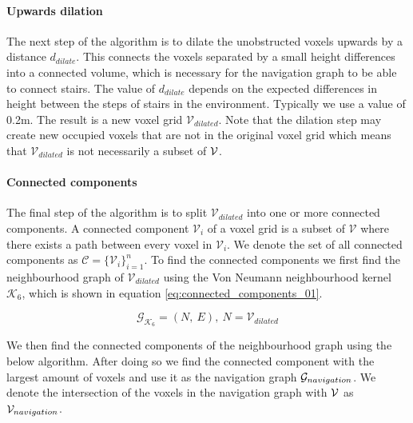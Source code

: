 \paragraph{Upwards dilation}
The next step of the algorithm is to dilate the unobstructed voxels upwards by a distance \(d_{dilate}\). This connects the voxels separated by a small height differences into a connected volume, which is necessary for the navigation graph to be able to connect stairs. The value of \(d_{dilate}\) depends on the expected differences in height between the steps of stairs in the environment. Typically we use a value of 0.2m. The result is a new voxel grid \(\mathcal{V}_{dilated}\). Note that the dilation step may create new occupied voxels that are not in the original voxel grid which means that \(\mathcal{V}_{dilated}\) is not necessarily a subset of \(\mathcal{V}\).

\paragraph{Connected components}
The final step of the algorithm is to split \(\mathcal{V}_{dilated}\) into one or more connected components. A connected component \(\mathcal{V}_i\) of a voxel grid is a subset of \(\mathcal{V}\) where there exists a path between every voxel in \(\mathcal{V}_i\). We denote the set of all connected components as \(\mathcal{C}=\{\mathcal{V}_{i}\}_{i=1}^n\). To find the connected components we first find the neighbourhood graph of \(\mathcal{V}_{dilated}\) using the Von Neumann neighbourhood kernel \(\mathcal{K}_6\), which is shown in equation \ref{eq:connected_components_01}. 

\begin{equation}
    \label{eq:connected_components_01}
    \mathcal{G}_{\mathcal{K}_6} = (N,\ E),\ N = \mathcal{V}_{dilated}
\end{equation}

We then find the connected components of the neighbourhood graph using the below algorithm. After doing so we find the connected component with the largest amount of voxels and use it as the navigation graph \(\mathcal{G}_{navigation}\). We denote the intersection of the voxels in the navigation graph with \(\mathcal{V}\) as \(\mathcal{V}_{navigation}\).



